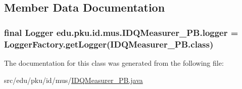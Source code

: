 \subsection{Member Data Documentation}
\hypertarget{classedu_1_1pku_1_1id_1_1mus_1_1_i_d_q_measurer___p_b_a005bb38ca77cc7c2c55bc99520e0b490}{
\subsubsection[{logger}]{\setlength{\rightskip}{0pt plus 5cm}final Logger {\bf edu.pku.id.mus.IDQMeasurer\_\-PB.logger} = LoggerFactory.getLogger(IDQMeasurer\_\-PB.class)}}
\label{classedu_1_1pku_1_1id_1_1mus_1_1_i_d_q_measurer___p_b_a005bb38ca77cc7c2c55bc99520e0b490}


The documentation for this class was generated from the following file:\begin{DoxyCompactItemize}
\item 
src/edu/pku/id/mus/\hyperlink{_i_d_q_measurer___p_b_8java}{IDQMeasurer\_\-PB.java}\end{DoxyCompactItemize}
